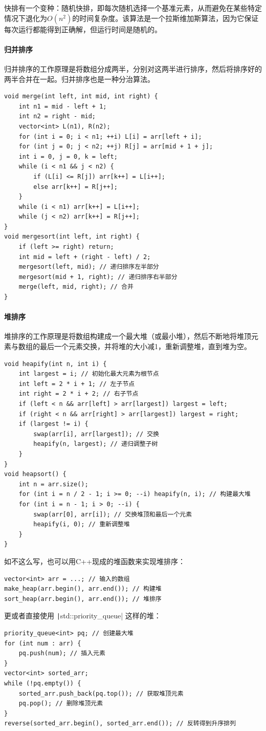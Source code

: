 快排有一个变种：随机快排，即每次随机选择一个基准元素，从而避免在某些特定情况下退化为$O(n^2)$的时间复杂度。该算法是一个拉斯维加斯算法，因为它保证每次运行都能得到正确解，但运行时间是随机的。

\paragraph{归并排序} 归并排序的工作原理是将数组分成两半，分别对这两半进行排序，然后将排序好的两半合并在一起。归并排序也是一种分治算法。

\begin{verbatim}
void merge(int left, int mid, int right) {
    int n1 = mid - left + 1;
    int n2 = right - mid;
    vector<int> L(n1), R(n2);
    for (int i = 0; i < n1; ++i) L[i] = arr[left + i];
    for (int j = 0; j < n2; ++j) R[j] = arr[mid + 1 + j];
    int i = 0, j = 0, k = left;
    while (i < n1 && j < n2) {
        if (L[i] <= R[j]) arr[k++] = L[i++];
        else arr[k++] = R[j++];
    }
    while (i < n1) arr[k++] = L[i++];
    while (j < n2) arr[k++] = R[j++];
}
void mergesort(int left, int right) {
    if (left >= right) return;
    int mid = left + (right - left) / 2;
    mergesort(left, mid); // 递归排序左半部分
    mergesort(mid + 1, right); // 递归排序右半部分
    merge(left, mid, right); // 合并
}
\end{verbatim}

\paragraph{堆排序} 堆排序的工作原理是将数组构建成一个最大堆（或最小堆），然后不断地将堆顶元素与数组的最后一个元素交换，并将堆的大小减1，重新调整堆，直到堆为空。

\begin{verbatim}
void heapify(int n, int i) {
    int largest = i; // 初始化最大元素为根节点
    int left = 2 * i + 1; // 左子节点
    int right = 2 * i + 2; // 右子节点
    if (left < n && arr[left] > arr[largest]) largest = left;
    if (right < n && arr[right] > arr[largest]) largest = right;
    if (largest != i) {
        swap(arr[i], arr[largest]); // 交换
        heapify(n, largest); // 递归调整子树
    }
}
void heapsort() {
    int n = arr.size();
    for (int i = n / 2 - 1; i >= 0; --i) heapify(n, i); // 构建最大堆
    for (int i = n - 1; i > 0; --i) {
        swap(arr[0], arr[i]); // 交换堆顶和最后一个元素
        heapify(i, 0); // 重新调整堆
    }
}
\end{verbatim}
如不这么写，也可以用C++现成的堆函数来实现堆排序：
\begin{verbatim}
vector<int> arr = ...; // 输入的数组
make_heap(arr.begin(), arr.end()); // 构建堆
sort_heap(arr.begin(), arr.end()); // 堆排序
\end{verbatim}
更或者直接使用 \texttt|std::priority_queue| 这样的堆：
\begin{verbatim}
priority_queue<int> pq; // 创建最大堆
for (int num : arr) {
    pq.push(num); // 插入元素
}
vector<int> sorted_arr;
while (!pq.empty()) {
    sorted_arr.push_back(pq.top()); // 获取堆顶元素
    pq.pop(); // 删除堆顶元素
}
reverse(sorted_arr.begin(), sorted_arr.end()); // 反转得到升序排列
\end{verbatim}

